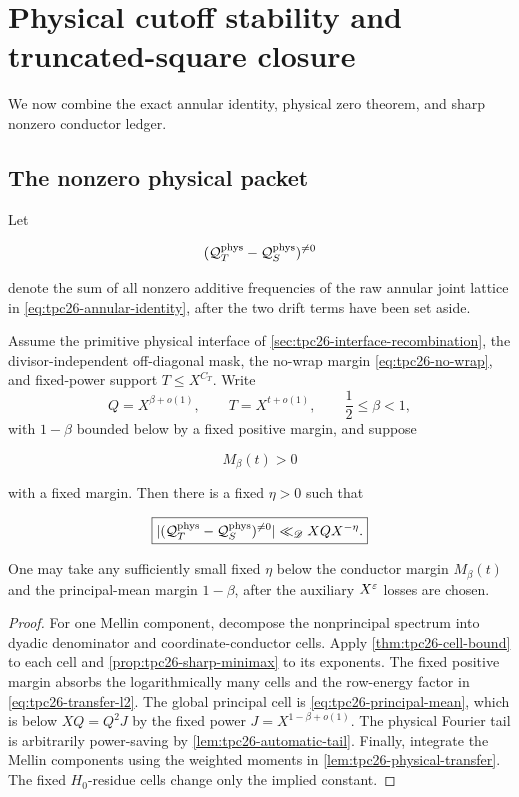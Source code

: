 \section{Physical cutoff stability and truncated-square closure}
\label{sec:tpc26-cutoff-stability}

We now combine the exact annular identity, physical zero theorem, and
sharp nonzero conductor ledger.

\subsection{The nonzero physical packet}

Let

\[
 (\mathcal Q_T^{\rm phys}-\mathcal Q_S^{\rm phys})^{\ne0}
\]

denote the sum of all nonzero additive frequencies of the raw annular
joint lattice in \eqref{eq:tpc26-annular-identity}, after the two drift
terms have been set aside.

\begin{theorem}
\label{thm:tpc26-nonzero-annulus}
Assume the primitive physical interface of
\cref{sec:tpc26-interface-recombination}, the divisor-independent
off-diagonal mask, the no-wrap margin \eqref{eq:tpc26-no-wrap}, and
fixed-power support \(T\le X^{C_T}\).  Write
\[
 Q=X^{\beta+o(1)},\qquad
 T=X^{t+o(1)},\qquad
 \frac12\le\beta<1,
\]
with \(1-\beta\) bounded below by a fixed positive margin, and suppose

\begin{equation}
 M_\beta(t)>0
 \label{eq:tpc26-positive-ledger}
\end{equation}

with a fixed margin.  Then there is a fixed \(\eta>0\) such that

\begin{equation}
 \boxed{
 |(\mathcal Q_T^{\rm phys}-\mathcal Q_S^{\rm phys})^{\ne0}|
 \ll_{\mathscr D}XQX^{-\eta}.}
 \label{eq:tpc26-nonzero-bound}
\end{equation}

One may take any sufficiently small fixed \(\eta\) below the conductor
margin \(M_\beta(t)\) and the principal-mean margin \(1-\beta\), after
the auxiliary \(X^\varepsilon\) losses are chosen.
\end{theorem}

\begin{proof}
For one Mellin component, decompose the nonprincipal spectrum into
dyadic denominator and coordinate-conductor cells.  Apply
\cref{thm:tpc26-cell-bound} to each cell and
\cref{prop:tpc26-sharp-minimax} to its exponents.  The fixed positive
margin absorbs the logarithmically many cells and the row-energy
factor in \eqref{eq:tpc26-transfer-l2}.  The global principal cell is
\eqref{eq:tpc26-principal-mean}, which is below \(XQ=Q^2J\) by the
fixed power \(J=X^{1-\beta+o(1)}\).  The physical Fourier tail is
arbitrarily power-saving by \cref{lem:tpc26-automatic-tail}.  Finally,
integrate the Mellin components using the weighted moments in
\cref{lem:tpc26-physical-transfer}.  The fixed \(H_0\)-residue cells
change only the implied constant.
\end{proof}


